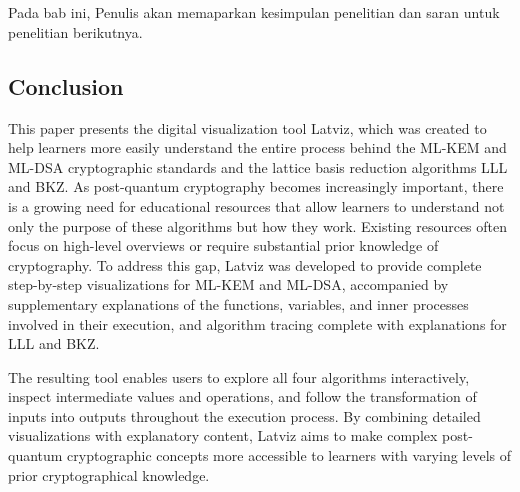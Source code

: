 \chapter{\kesimpulan}
\label{bab:6}
Pada bab ini, Penulis akan memaparkan kesimpulan penelitian dan saran untuk penelitian berikutnya.


\section{Conclusion}
\label{sec:kesimpulan}
This paper presents the digital visualization tool Latviz, which was created to help learners more easily understand the entire process behind the ML-KEM and ML-DSA cryptographic standards and the lattice basis reduction algorithms LLL and BKZ. As post-quantum cryptography becomes increasingly important, there is a growing need for educational resources that allow learners to understand not only the purpose of these algorithms but how they work. Existing resources often focus on high-level overviews or require substantial prior knowledge of cryptography. To address this gap, Latviz was developed to provide complete step-by-step visualizations for ML-KEM and ML-DSA, accompanied by supplementary explanations of the functions, variables, and inner processes involved in their execution, and algorithm tracing complete with explanations for LLL and BKZ.

The resulting tool enables users to explore all four algorithms interactively, inspect intermediate values and operations, and follow the transformation of inputs into outputs throughout the execution process. By combining detailed visualizations with explanatory content, Latviz aims to make complex post-quantum cryptographic concepts more accessible to learners with varying levels of prior cryptographical knowledge.

